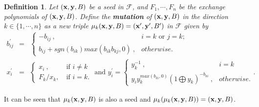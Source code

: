 \documentclass[14pt]{amsart}
\newtheorem{Definition}[Theorem]{Definition}
\begin{document}
\begin{Definition}\label{defmutation}
Let $({\bf x},{\bf y},B)$ be a  seed in $\mathcal F$, and $F_1,\cdots, F_n$ be the exchange polynomials of  $({\bf x},{\bf y},B)$. Define the {\bf mutation}  of  $({\bf x},{\bf y},B)$ in the direction $k\in\{1,\cdots,n\}$ as a new triple $\mu_k({\bf x},{\bf y},B)=( {\bf x}^{\prime},  {\bf y}^{\prime},  B^{\prime})$ in $\mathcal F$
given by
\begin{eqnarray}
b_{ij}^{\prime}&=&\begin{cases}-b_{ij}~,& i=k\text{ or } j=k;\\ b_{ij}+sgn(b_{ik})max(b_{ik}b_{kj},0)~,&otherwise.\end{cases}\nonumber\\
x_i^{\prime}&=&\begin{cases}x_i~,&\text{if } i\neq k\\ F_k/x_k,~& \text{if }i=k.\end{cases}\text{ and }
 y_i^{\prime}=\begin{cases} y_k^{-1}~,& i=k\\ y_iy_k^{max(b_{ki},0)}(1\bigoplus y_k)^{-b_{ki}}~,&otherwise.
\end{cases}.\nonumber
\end{eqnarray}
\end{Definition}
It can be seen that $\mu_k({\bf x},{\bf y},B)$ is also a  seed and $\mu_k(\mu_k({\bf x},{\bf y},B))=({\bf x},{\bf y},B)$.
\end{document}
